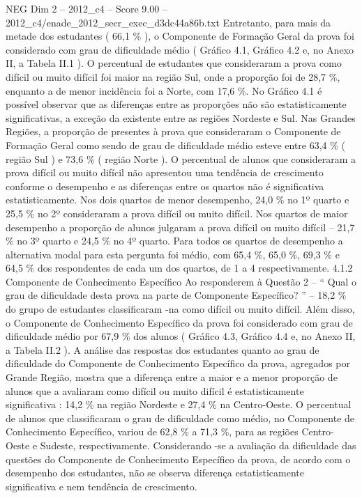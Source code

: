 \begin{textsample}{NEG Dim 2 – 2012\_c4 – Score 9.00 – 2012\_c4/enade\_2012\_secr\_exec\_d3dc44a86b.txt}
Entretanto, para mais da metade dos estudantes ( 66,1 \% ), o Componente de Formação Geral da prova foi considerado com grau de dificuldade médio ( Gráfico 4.1, Gráfico 4.2 e, no Anexo II, a Tabela II.1 ).
O percentual de estudantes que consideraram a prova como difícil ou muito difícil foi maior na região Sul, onde a proporção foi de 28,7 \%, enquanto a de menor incidência foi a Norte, com 17,6 \%.
No Gráfico 4.1 é possível observar que as diferenças entre as proporções não são estatisticamente significativas, a exceção da existente entre as regiões Nordeste e Sul.
Nas Grandes Regiões, a proporção de presentes à prova que consideraram o Componente de Formação Geral como sendo de grau de dificuldade médio esteve entre 63,4 \% ( região Sul ) e 73,6 \% ( região Norte ).
O percentual de alunos que consideraram a prova difícil ou muito difícil não apresentou uma tendência de crescimento conforme o desempenho e as diferenças entre os quartos não é significativa estatisticamente.
Nos dois quartos de menor desempenho, 24,0 \% no 1º quarto e 25,5 \% no 2º consideraram a prova difícil ou muito difícil.
Nos quartos de maior desempenho a proporção de alunos julgaram a prova difícil ou muito difícil – 21,7 \% no 3º quarto e 24,5 \% no 4º quarto.
Para todos os quartos de desempenho a alternativa modal para esta pergunta foi médio, com 65,4 \%, 65,0 \%, 69,3 \% e 64,5 \% dos respondentes de cada um dos quartos, de 1 a 4 respectivamente. 4.1.2 Componente de Conhecimento Específico Ao responderem à Questão 2 – “ Qual o grau de dificuldade desta prova na parte de Componente Específico? ” – 18,2 \% do grupo de estudantes classificaram -na como difícil ou muito difícil.
Além disso, o Componente de Conhecimento Específico da prova foi considerado com grau de dificuldade médio por 67,9 \% dos alunos ( Gráfico 4.3, Gráfico 4.4 e, no Anexo II, a Tabela II.2 ).
A análise das respostas dos estudantes quanto ao grau de dificuldade do Componente de Conhecimento Específico da prova, agregados por Grande Região, mostra que a diferença entre a maior e a menor proporção de alunos que a avaliaram como difícil ou muito difícil é estatisticamente significativa : 14,2 \% na região Nordeste e 27,4 \% na Centro-Oeste.
O percentual de alunos que classificaram o grau de dificuldade como médio, no Componente de Conhecimento Específico, variou de 62,8 \% a 71,3 \%, para as regiões Centro-Oeste e Sudeste, respectivamente.
Considerando -se a avaliação da dificuldade das questões do Componente de Conhecimento Específico da prova, de acordo com o desempenho dos estudantes, não se observa diferença estatisticamente significativa e nem tendência de crescimento.

\end{textsample}
